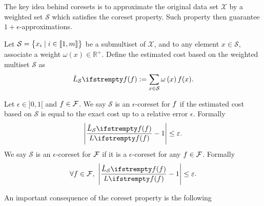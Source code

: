 The key idea behind coresets is to approximate the original data
set $\mathcal{X}$ by a weighted set $\mathcal{S}$ which satisfies the coreset property. Such property then guarantee $1+\epsilon$-approximations.

Let $\mathcal{S}=\begin{Bmatrix}
x_{i} \mid i\in \llbracket 1,m \rrbracket
\end{Bmatrix}$ be a submultiset of $\mathcal{X}$, and to any element $x \in \mathcal{S}$, associate a weight $\omega\left(x\right) \in \mathbb{R}^{+}$. Define the estimated cost based on the weighted multiset $\mathcal{S}$ as
\begin{equation*}
    \estloss{\mathcal{S}}{\query}:=\sum_{x \in \mathcal{S}} \omega\left(x\right) \query(x).
\end{equation*}
\begin{tcolorbox}
    
    \begin{definition}[Coreset]
        \label{def_coresetprop}
        Let $\epsilon \in {]}0,1{[}$ and $f \in \mathcal{F}$. We say $\mathcal{S}$ is an $\epsilon$-coreset for $f$ if the estimated cost based on $\mathcal{S}$ is equal to the exact cost up to a relative error $\epsilon$. Formally
        \begin{equation}
            \label{eqn_querycoresetprop}
            \left|\frac{\estloss{\mathcal{S}}{\query}}{\loss{\query}}-1\right| \le \epsilon.
        \end{equation}
        We say $\mathcal{S}$ is an $\epsilon$-coreset for $\mathcal{F}$ if it is a $\epsilon$-coreset for any $f \in \mathcal{F}$. Formally
        \begin{equation}
            \label{eqn_qsetcoresetprop}
            \forall \query \in \qset,\ \left|\frac{\estloss{\mathcal{S}}{\query}}{\loss{\query}}-1\right| \le \epsilon.
        \end{equation}
    \end{definition}
\end{tcolorbox}

An important consequence of the coreset property is the following

